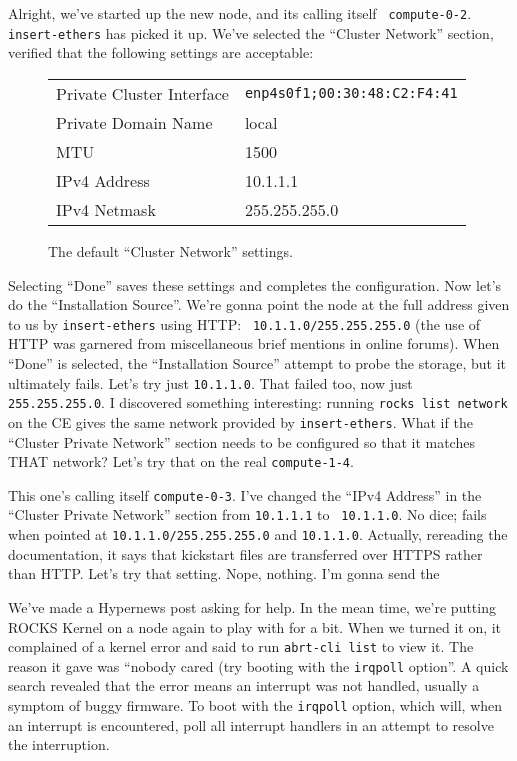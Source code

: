 \documentclass[12pt]{article}
\begin{document}
\qq Alright, we've started up the new node, and its calling itself {\tt
  compute-0-2}. {\tt insert-ethers} has picked it up. We've selected the
``Cluster Network'' section, verified that the following settings are
acceptable:

\begin{figure}[H]
  \caption{The default ``Cluster Network'' settings.}
  \begin{tabular}{|l|l|}
    \hline
    Private Cluster Interface & {\tt enp4s0f1;00:30:48:C2:F4:41} \\
    Private Domain Name & local \\
    MTU & 1500 \\
    IPv4 Address & 10.1.1.1 \\
    IPv4 Netmask & 255.255.255.0 \\
    \hline
  \end{tabular}
\end{figure}

Selecting ``Done'' saves these settings and completes the configuration. Now
let's do the ``Installation Source''. We're gonna point the node at the full
address given to us by {\tt insert-ethers} using HTTP: {\tt
  10.1.1.0/255.255.255.0} (the use of HTTP was garnered from miscellaneous
brief mentions in online forums). When ``Done'' is selected, the ``Installation
Source'' attempt to probe the storage, but it ultimately fails. Let's try just
{\tt 10.1.1.0}. That failed too, now just {\tt 255.255.255.0}. I discovered
something interesting: running {\tt rocks list network} on the CE gives the same
network provided by {\tt insert-ethers}. What if the ``Cluster Private Network''
section needs to be configured so that it matches THAT network? Let's try that
on the real {\tt compute-1-4}.

\qq This one's calling itself {\tt compute-0-3}. I've changed the ``IPv4
Address'' in the ``Cluster Private Network'' section from {\tt 10.1.1.1} to {\tt
  10.1.1.0}. No dice; fails when pointed at {\tt 10.1.1.0/255.255.255.0} and
{\tt 10.1.1.0}. Actually, rereading the documentation, it says that kickstart
files are transferred over HTTPS rather than HTTP. Let's try that setting. Nope,
nothing. I'm gonna send the 

\qq We've made a Hypernews post asking for help. In the mean time, we're putting
ROCKS Kernel on a node again to play with for a bit. When we turned it on, it
complained of a kernel error and said to run {\tt abrt-cli list} to view it. The
reason it gave was ``nobody cared (try booting with the {\tt irqpoll}
option''. A quick search revealed that the error means an interrupt was not
handled, usually a symptom of buggy firmware. To boot with the {\tt irqpoll}
option, which will, when an interrupt is encountered, poll all interrupt
handlers in an attempt to resolve the interruption. 
\end{document}
